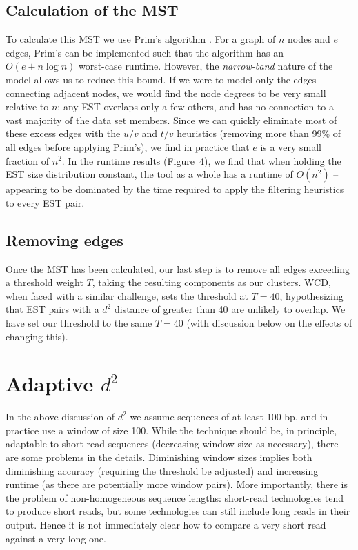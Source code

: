 \documentclass[a4paper,12pt]{article}
\newcommand{\mc}[1]{#1}   %
\newcommand{\wcd} {{\small WCD}}
\begin{document}
\begin{appendix}
\subsection{Calculation of the MST}

To calculate this MST we use Prim's algorithm \cite{Prim57}.  For a
graph of $n$ nodes and $e$ edges, Prim's can be implemented such that
the algorithm has an $O(e + n \log n)$ worst-case runtime.  However,
the {\it narrow-band} nature of the model allows us to reduce this
bound.  If we were to model only the edges connecting adjacent nodes,
we would find the node degrees to be very small relative to $n$: any
EST overlaps only a few others, and has no connection to a vast
majority of the data set members.  Since we can quickly eliminate most
of these excess edges with the $u/v$ and $t/v$ heuristics (removing
more than 99\% of all edges before applying Prim's), we find in
practice that $e$ is a very small fraction of $n^2$.  In the
runtime results (Figure~4), we find that when holding the EST size
distribution constant, the tool as a whole has a runtime of $O(n^2)$
-- appearing to be dominated by the time required to apply
the filtering heuristics to every EST pair.

\subsection{Removing edges}

Once the MST has been calculated, our last step is to remove all
edges exceeding a threshold weight $T$, taking the resulting
components as our clusters.  \wcd, when faced with a similar
challenge, sets the threshold at $T=40$, hypothesizing that EST pairs
with a $d^2$ distance of greater than 40 are unlikely to overlap.  \mc{We
have set our threshold to the same $T=40$ (with discussion below on
the effects of changing this).}

\section{Adaptive $d^2$}

\mc{In the above discussion of $d^2$ we assume sequences of at least 100
bp, and in practice use a window of size 100.  While the technique
should be, in principle, adaptable to short-read sequences (decreasing
window size as necessary), there are some problems in the details.
Diminishing window sizes implies both diminishing accuracy (requiring
the threshold be adjusted) and increasing runtime (as there are
potentially more window pairs).  More importantly, there is the
problem of non-homogeneous sequence lengths: short-read technologies
tend to produce short reads, but some technologies can still include
long reads in their output.  Hence it is not immediately clear how to
compare a very short read against a very long one.}


\end{appendix}
\end{document}
